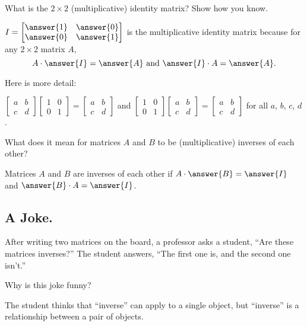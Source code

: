 \documentclass[space,nooutcomes]{ximera}
\begin{document}
\begin{question}
What is the $2\times 2$ (multiplicative) identity matrix?  Show how you know.
\begin{solution}
$I = \begin{bmatrix} \answer{1}&\answer{0} \\ \answer{0}&\answer{1} \end{bmatrix}$ is the multiplicative identity matrix because for any $2\times 2$ matrix $A$, 
\[
A\cdot\answer{I} = \answer{A}\text{ and }\answer{I}\cdot A=\answer{A}.  
\]
\begin{question}
Here is more detail:  

$\begin{bmatrix} a&b \\ c&d \end{bmatrix}  \begin{bmatrix} 1&0 \\ 0&1 \end{bmatrix} = 
\begin{bmatrix} a&b \\ c&d \end{bmatrix}$  
and
$\begin{bmatrix} 1&0 \\ 0&1 \end{bmatrix} \begin{bmatrix} a&b \\ c&d \end{bmatrix} = 
\begin{bmatrix} a&b \\ c&d \end{bmatrix}$  for all $a$, $b$, $c$, $d$.  
\end{question}
\end{solution}
\end{question}

\begin{question}
What does it mean for matrices $A$ and $B$ to be (multiplicative) inverses of each other?  

\begin{solution}
Matrices $A$ and $B$ are inverses of each other if $A\cdot\answer{B}=\answer{I}$ and $\answer{B}\cdot A=\answer{I}$.  
\end{solution}
\end{question}

\subsection*{A Joke.}  After writing two matrices on the board, a professor asks a student, ``Are these matrices inverses?''  The student answers, ``The first one is, and the second one isn't.''  
\begin{question}
Why is this joke funny?  
\begin{freeResponse}
\begin{hint}
The student thinks that ``inverse'' can apply to a single object, but ``inverse'' is a relationship between a pair of objects.  
\end{hint}
\end{freeResponse}
\end{question}
\end{document}
